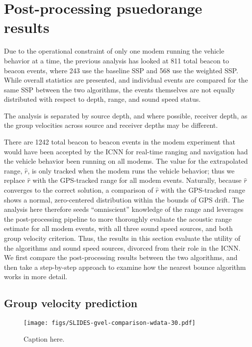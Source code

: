 \FloatBarrier
\section{\label{sec:5} Post-processing psuedorange results}

Due to the operational constraint of only one modem running the vehicle behavior at a time, the previous analysis has looked at 811 total beacon to beacon events, where 243 use the baseline SSP and 568 use the weighted SSP.
While overall statistics are presented, and individual events are compared for the same SSP between the two algorithms, the events themselves are not equally distributed with respect to depth, range, and sound speed status.

The analysis is separated by source depth, and where possible, receiver depth, as the group velocities across source and receiver depths may be different.

There are 1242 total beacon to beacon events in the modem experiment that would have been accepted by the ICNN for real-time ranging and navigation had the vehicle behavior been running on all modems.
The value for the extrapolated range, $\hat{r}$, is only tracked when the modem runs the vehicle behavior; thus we replace $\hat{r}$ with the GPS-tracked range for all modem events.
Naturally, because $\hat{r}$ converges to the correct solution, a comparison of $\hat{r}$ with the GPS-tracked range shows a normal, zero-centered distribution within the bounds of GPS drift.
The analysis here therefore seeds ``omniscient'' knowledge of the range and leverages the post-processing pipeline to more thoroughly evaluate the acoustic range estimate for all modem events, with all three sound speed sources, and both group velocity criterion.
Thus, the results in this section evaluate the utility of the algorithms and sound speed sources, divorced from their role in the ICNN.
We first compare the post-processing results between the two algorithms, and then take a step-by-step approach to examine how the nearest bounce algorithm works in more detail.

\FloatBarrier
\subsection{Group velocity prediction}

\begin{figure}[h!]
\texttt{[image: figs/SLIDES-gvel-comparison-wdata-30.pdf]}
\caption{\label{fig:gvel30}{Caption here.}}
\end{figure}

